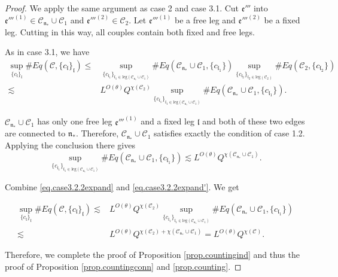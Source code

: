\begin{proof}
We apply the same argument as case 2 and case 3.1. Cut $\mathfrak{e}'''$ into $\mathfrak{e}'''^{(1)}\in  \mathcal{C}_{\mathfrak{n}_*}\cup \mathcal{C}_1$ and $\mathfrak{e}'''^{(2)}\in  \mathcal{C}_2$. Let $\mathfrak{e}'''^{(1)}$ be a free leg and $\mathfrak{e}'''^{(2)}$ be a fixed leg. Cutting in this way, all couples contain both fixed and free legs.

As in case 3.1, we have
\begin{equation}\label{eq.case3.2.2expand}
\begin{split}
    \sup_{\{c_{\mathfrak{l}}\}_{\mathfrak{l}}}\#Eq(\mathcal{C},\{c_{\mathfrak{l}}\}_{\mathfrak{l}})
    \le&
    \sup_{\{c_{\mathfrak{l}_1}\}_{\mathfrak{l}_1\in \text{leg}(\mathcal{C}_{\mathfrak{n}_*}\cup \mathcal{C}_1)} } \# Eq(\mathcal{C}_{\mathfrak{n}_*}\cup \mathcal{C}_1,\{c_{\mathfrak{l}_1}\}) \sup_{\{c_{\mathfrak{l}_2}\}_{\mathfrak{l}_2\in \text{leg}(\mathcal{C}_2)} }\# Eq(\mathcal{C}_{2}, \{c_{\mathfrak{l}_2}\})
    \\
    \lesssim&  L^{O(\theta)} Q^{\chi(\mathcal{C}_2)}\sup_{\{c_{\mathfrak{l}_1}\}_{\mathfrak{l}_1\in \text{leg}(\mathcal{C}_{\mathfrak{n}_*}\cup \mathcal{C}_1)} } \# Eq(\mathcal{C}_{\mathfrak{n}_*}\cup \mathcal{C}_1,\{c_{\mathfrak{l}_1}\}).
\end{split}
\end{equation}

$\mathcal{C}_{\mathfrak{n}_*}\cup \mathcal{C}_1$ has only one free leg $\mathfrak{e}'''^{(1)}$ and a fixed leg $\mathfrak{l}$ and both of these two edges are connected to $\mathfrak{n}_*$. Therefore, $\mathcal{C}_{\mathfrak{n}_*}\cup \mathcal{C}_1$ satisfies exactly the condition of case 1.2. Applying the conclusion there gives
\begin{equation}\label{eq.case3.2.2expand'}
    \sup_{\{c_{\mathfrak{l}_1}\}_{\mathfrak{l}_1\in \text{leg}(\mathcal{C}_{\mathfrak{n}_*}\cup \mathcal{C}_1)} } \# Eq(\mathcal{C}_{\mathfrak{n}_*}\cup \mathcal{C}_1,\{c_{\mathfrak{l}_1}\})\lesssim L^{O(\theta)} Q^{\chi(\mathcal{C}_{\mathfrak{n}_*}\cup \mathcal{C}_1)}.
\end{equation}

Combine \eqref{eq.case3.2.2expand} and \eqref{eq.case3.2.2expand'}. We get 

\begin{equation}
\begin{split}
    \sup_{\{c_{\mathfrak{l}}\}_{\mathfrak{l}}}\#Eq(\mathcal{C},\{c_{\mathfrak{l}}\}_{\mathfrak{l}})
    \lesssim&  L^{O(\theta)} Q^{\chi(\mathcal{C}_2)}\sup_{\{c_{\mathfrak{l}_1}\}_{\mathfrak{l}_1\in \text{leg}(\mathcal{C}_{\mathfrak{n}_*}\cup \mathcal{C}_1)} } \# Eq(\mathcal{C}_{\mathfrak{n}_*}\cup \mathcal{C}_1,\{c_{\mathfrak{l}_1}\})
    \\
    \lesssim& L^{O(\theta)} Q^{\chi(\mathcal{C}_2)+\chi(\mathcal{C}_{\mathfrak{n}_*}\cup \mathcal{C}_1)}=L^{O(\theta)} Q^{\chi(\mathcal{C})}.
\end{split}
\end{equation}

Therefore, we complete the proof of Proposition \ref{prop.countingind} and thus the proof of Proposition \ref{prop.countingconn} and \ref{prop.counting}.

\end{proof}

